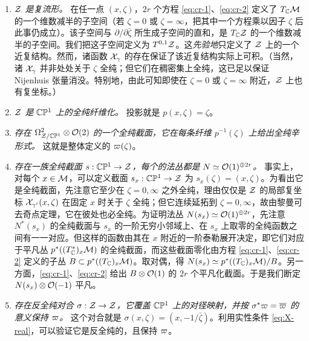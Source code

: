 \begin{enumerate}

\item  \emph{$\mathcal{Z}$ 是复流形。}
在任一点 $(x, \zeta)$，$2r$ 个方程 \eqref{eq:cr-1}、\eqref{eq:cr-2} 定义了 $T_{\mathbb{C}} \mathcal{M}$ 的一个维数减半的子空间（若 $\zeta = 0$ 或 $\zeta = \infty$，把其中一个方程乘以因子 $\zeta$ 后此事仍成立）。该子空间与 $\partial / \partial \bar{\zeta}$ 所生成子空间的直和，是 $T_{\mathbb{C}} \mathcal{Z}$ 的一个维数减半的子空间。我们把这子空间定义为 $T^{0,1} \mathcal{Z}$。这\emph{先验地}只定义了 $\mathcal{Z}$ 上的一个近复结构。然而，诸函数 $\mathcal{X}_\gamma$ 的存在保证了该近复结构实际上可积。（当然，诸 $\mathcal{X}_\gamma$ 并非处处关于 $\zeta$ 全纯；但它们在稠密集上全纯，这已足以保证 Nijenhuis 张量消没。特别地，由此可知即使在 $\zeta = 0$ 或 $\zeta = \infty$ 附近，$\mathcal{Z}$ 上也有复坐标。）

\item  \emph{$\mathcal{Z}$ 是 $\mathbb{C}\mathbb{P}^1$ 上的全纯纤维化。}
投影就是 $p(x, \zeta) = \zeta$。

\item  \emph{存在 $\Omega^2_{\mathcal{Z}/\mathbb{C} \mathbb{P}^1} \otimes \mathcal{O}(2)$ 的一个全纯截面，它在每条纤维 $p^{-1}(\zeta)$ 上给出全纯辛形式。} 这就是整体定义的 $\varpi(\zeta)$。

\item  \emph{存在一族全纯截面 $s: \mathbb{C}\mathbb{P}^1 \to \mathcal{Z}$，每个的法丛都是 $N \simeq \mathcal{O}(1)^{\oplus 2r}$。}
事实上，对每个 $x \in \mathcal{M}$，可以定义截面 $s_x: \mathbb{C} \mathbb{P}^1 \to \mathcal{Z}$ 为 $s_x(\zeta) = (x, \zeta)$。为看出它是全纯截面，先注意它至少在 $\zeta = 0,\infty$ 之外全纯，理由仅仅是 $\mathcal{Z}$ 的局部复坐标 $\mathcal{X}_{\gamma^i}(x, \zeta)$ 在固定 $x$ 时关于 $\zeta$ 全纯；但它连续延拓到 $\zeta = 0,\infty$，故由黎曼可去奇点定理，它在彼处也必全纯。为证明法丛 $N(s_x) \simeq \mathcal{O}(1)^{\oplus 2r}$，先注意 $N^*(s_x)$ 的全纯截面与 $s_x$ 的一阶无穷小邻域上、在 $s_x$ 上取零的全纯函数之间有一一对应。但这样的函数由其在 $x$ 附近的一阶泰勒展开决定，即它们对应于平凡丛 $p^*((T^*_{\mathbb{C}})_x \mathcal{M})$ 的全纯截面，而这些截面零化由方程 \eqref{eq:cr-1}、\eqref{eq:cr-2} 定义的子丛 $B \subset p^*((T_{\mathbb{C}})_x \mathcal{M})$。取对偶，得 $N(s_x) \simeq p^*((T_{\mathbb{C}})_x \mathcal{M}) / B$。另一方面，\eqref{eq:cr-1}、\eqref{eq:cr-2} 给出 $B \otimes \mathcal{O}(1)$ 的 $2r$ 个平凡化截面。于是我们断定 $N(s_x) \otimes \mathcal{O}(-1)$ 平凡。

\item  \emph{存在反全纯对合 $\sigma: \mathcal{Z} \to \mathcal{Z}$，它覆盖 $\mathbb{C} \mathbb{P}^1$ 上的对径映射，并按 $\sigma^* \varpi = \overline{ \varpi}$ 的意义保持 $\varpi$。} 这个对合就是 $\sigma(x, \zeta) = (x, - 1 / \bar\zeta)$。利用实性条件 \eqref{eq:X-real}，可以验证它是反全纯的，且保持 $\varpi$。
\end{enumerate}

